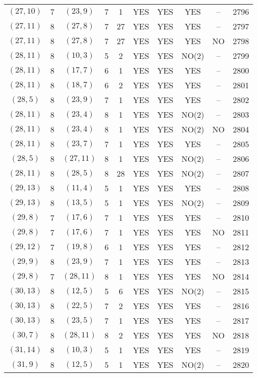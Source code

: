 \begin{longtable}{|c|c|c|c|c|c|c|c|c|c|}
$(27, 10)$ & 7 & $(23, 9)$ & 7 & 1 & YES & YES & YES & -- & 2796\\
$(27, 11)$ & 8 & $(27, 8)$ & 7 & 27 & YES & YES & YES & -- & 2797\\
$(27, 11)$ & 8 & $(27, 8)$ & 7 & 27 & YES & YES & YES & NO & 2798\\
$(28, 11)$ & 8 & $(10, 3)$ & 5 & 2 & YES & YES & NO(2) & -- & 2799\\
$(28, 11)$ & 8 & $(17, 7)$ & 6 & 1 & YES & YES & YES & -- & 2800\\
$(28, 11)$ & 8 & $(18, 7)$ & 6 & 2 & YES & YES & YES & -- & 2801\\
$(28, 5)$ & 8 & $(23, 9)$ & 7 & 1 & YES & YES & YES & -- & 2802\\
$(28, 11)$ & 8 & $(23, 4)$ & 8 & 1 & YES & YES & NO(2) & -- & 2803\\
$(28, 11)$ & 8 & $(23, 4)$ & 8 & 1 & YES & YES & NO(2) & NO & 2804\\
$(28, 11)$ & 8 & $(23, 7)$ & 7 & 1 & YES & YES & YES & -- & 2805\\
$(28, 5)$ & 8 & $(27, 11)$ & 8 & 1 & YES & YES & NO(2) & -- & 2806\\
$(28, 11)$ & 8 & $(28, 5)$ & 8 & 28 & YES & YES & NO(2) & -- & 2807\\
$(29, 13)$ & 8 & $(11, 4)$ & 5 & 1 & YES & YES & YES & -- & 2808\\
$(29, 13)$ & 8 & $(13, 5)$ & 5 & 1 & YES & YES & NO(2) & -- & 2809\\
$(29, 8)$ & 7 & $(17, 6)$ & 7 & 1 & YES & YES & YES & -- & 2810\\
$(29, 8)$ & 7 & $(17, 6)$ & 7 & 1 & YES & YES & YES & NO & 2811\\
$(29, 12)$ & 7 & $(19, 8)$ & 6 & 1 & YES & YES & YES & -- & 2812\\
$(29, 9)$ & 8 & $(23, 9)$ & 7 & 1 & YES & YES & YES & -- & 2813\\
$(29, 8)$ & 7 & $(28, 11)$ & 8 & 1 & YES & YES & YES & NO & 2814\\
$(30, 13)$ & 8 & $(12, 5)$ & 5 & 6 & YES & YES & NO(2) & -- & 2815\\
$(30, 13)$ & 8 & $(22, 5)$ & 7 & 2 & YES & YES & YES & -- & 2816\\
$(30, 13)$ & 8 & $(23, 5)$ & 7 & 1 & YES & YES & YES & -- & 2817\\
$(30, 7)$ & 8 & $(28, 11)$ & 8 & 2 & YES & YES & YES & NO & 2818\\
$(31, 14)$ & 8 & $(10, 3)$ & 5 & 1 & YES & YES & YES & -- & 2819\\
$(31, 9)$ & 8 & $(12, 5)$ & 5 & 1 & YES & YES & NO(2) & -- & 2820\\

\end{longtable}

